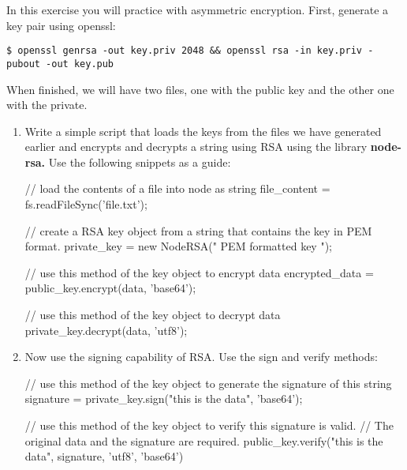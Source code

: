 
\begin{Exercise}[label={basic-js-crypto-rsa}]
In this exercise you will practice with asymmetric encryption.
First, generate a key pair using openssl:

\begin{lstlisting}[style=terms]
$ openssl genrsa -out key.priv 2048 && openssl rsa -in key.priv -pubout -out key.pub
\end{lstlisting}

When finished, we will have two files, 
one with the public key and the other one with the private.

\begin{enumerate}[1.]

\item Write a simple script that loads the keys from the files we have generated earlier and encrypts and decrypts a string using RSA using the library \textbf{node-rsa.}
Use the following snippets as a guide:
\begin{js}
// load the contents of a file into node as string
file_content = fs.readFileSync('file.txt');

// create a RSA key object from a string that contains the key in PEM format.
private_key = new NodeRSA(" PEM formatted key ");

// use this method of the key object to encrypt data
encrypted_data = public_key.encrypt(data, 'base64');

// use this method of the key object to decrypt data
private_key.decrypt(data, 'utf8');
\end{js}
\item Now use the signing capability of RSA. Use the sign and verify methods:
\begin{js}
// use this method of the key object to generate the signature of this string
signature = private_key.sign("this is the data", 'base64');

// use this method of the key object to verify this signature is valid.
// The original data and the signature are required.
public_key.verify("this is the data", signature, 'utf8', 'base64')
\end{js}
	
\end{enumerate}
\end{Exercise}

